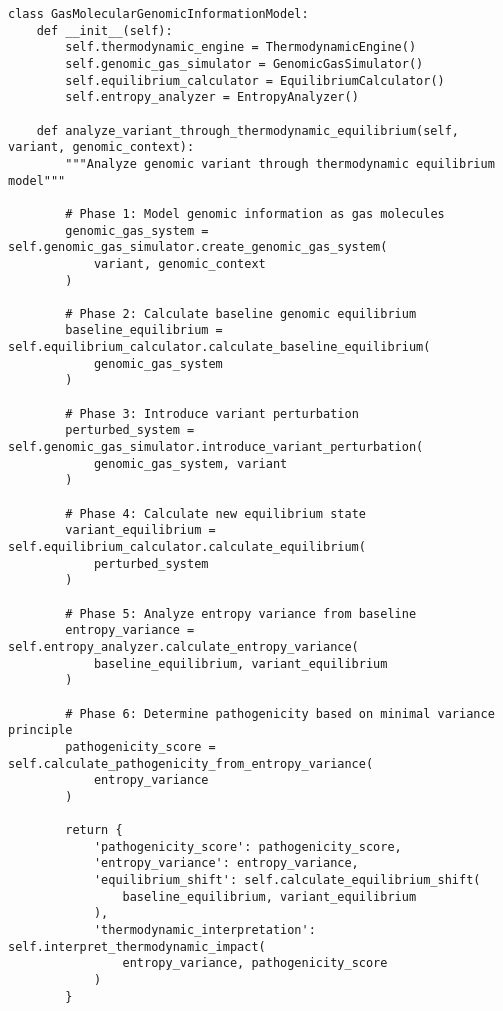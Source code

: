 \documentclass[12pt,a4paper]{article}
\begin{document}
\begin{lstlisting}[style=pythonstyle, caption=Gas Molecular Genomic Information Model Implementation]
class GasMolecularGenomicInformationModel:
    def __init__(self):
        self.thermodynamic_engine = ThermodynamicEngine()
        self.genomic_gas_simulator = GenomicGasSimulator()
        self.equilibrium_calculator = EquilibriumCalculator()
        self.entropy_analyzer = EntropyAnalyzer()
        
    def analyze_variant_through_thermodynamic_equilibrium(self, variant, genomic_context):
        """Analyze genomic variant through thermodynamic equilibrium model"""
        
        # Phase 1: Model genomic information as gas molecules
        genomic_gas_system = self.genomic_gas_simulator.create_genomic_gas_system(
            variant, genomic_context
        )
        
        # Phase 2: Calculate baseline genomic equilibrium
        baseline_equilibrium = self.equilibrium_calculator.calculate_baseline_equilibrium(
            genomic_gas_system
        )
        
        # Phase 3: Introduce variant perturbation
        perturbed_system = self.genomic_gas_simulator.introduce_variant_perturbation(
            genomic_gas_system, variant
        )
        
        # Phase 4: Calculate new equilibrium state
        variant_equilibrium = self.equilibrium_calculator.calculate_equilibrium(
            perturbed_system
        )
        
        # Phase 5: Analyze entropy variance from baseline
        entropy_variance = self.entropy_analyzer.calculate_entropy_variance(
            baseline_equilibrium, variant_equilibrium
        )
        
        # Phase 6: Determine pathogenicity based on minimal variance principle
        pathogenicity_score = self.calculate_pathogenicity_from_entropy_variance(
            entropy_variance
        )
        
        return {
            'pathogenicity_score': pathogenicity_score,
            'entropy_variance': entropy_variance,
            'equilibrium_shift': self.calculate_equilibrium_shift(
                baseline_equilibrium, variant_equilibrium
            ),
            'thermodynamic_interpretation': self.interpret_thermodynamic_impact(
                entropy_variance, pathogenicity_score
            )
        }
    

\end{lstlisting}
\end{document}
